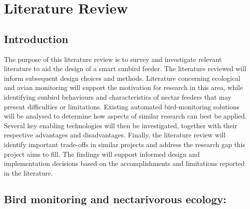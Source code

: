 
\glsresetall %
\chapter[Literature Review]{Literature Review}\label{ch:LitReview}


\section{Introduction}

The purpose of this literature review is to survey and investigate relevant literature to aid the design of a smart sunbird feeder. The literature reviewed will inform subsequent design choices and methods. Literature concerning ecological and avian monitoring will support the motivation for research in this area, while identifying sunbird behaviours and characteristics of nectar feeders that may present difficulties or limitations. Existing automated bird-monitoring solutions will be analysed to determine how aspects of similar research can best be applied. Several key enabling technologies will then be investigated, together with their respective advantages and disadvantages. Finally, the literature review will identify important trade-offs in similar projects and address the research gap this project aims to fill. The findings will support informed design and implementation decisions based on the accomplishments and limitations reported in the literature.

\section{Bird monitoring and nectarivorous ecology:}

